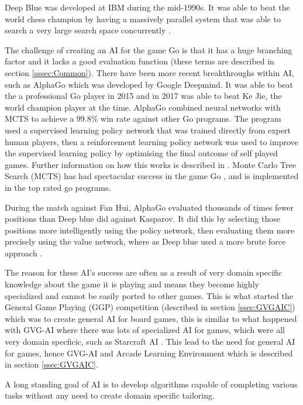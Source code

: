\documentclass[journal]{IEEEtran}
\begin{document}
		Deep Blue was developed at IBM during the mid-1990s. It was able to beat the world chess champion by having a massively parallel system that was able to search a very large search space concurrently \cite{DeepBlue}.

		The challenge of creating an AI for the game Go is that it has a huge branching factor and it lacks a good evaluation function (these terms are described in section \ref{sssec:Common}). 
		There have been more recent breakthroughs within AI, such as AlphaGo \cite{silver2016mastering} which was developed by Google Deepmind. It was able to beat the a professional Go player in 2015 and in 2017 was able to beat Ke Jie, the world champion player at the time\cite{silver2016mastering}.
		AlphaGo combined neural networks with MCTS to achieve a 99.8\% win rate against other Go programs. The program used a supervised learning policy network that was trained directly from expert human players, then a reinforcement learning policy network was used to improve the supervised learning policy by optimising the final outcome of self played games. Further information on how this works is described in \cite{silver2016mastering}.
		Monte Carlo Tree Search (MCTS) has had spectacular success in the game Go \cite{browne2012survey}, and is implemented in the top rated go programs.

		During the match against Fan Hui, AlphaGo evaluated thousands of times fewer positions than Deep blue did against Kasparov. It did this by selecting those positions more intelligently using the policy network, then evaluating them more precisely using the value network, where as Deep blue used a more brute force approach \cite{silver2016mastering, DeepBlue}.

		The reason for these AI's success are often as a result of very domain specific knowledge about the game it is playing and means they become highly specialized and cannot be easily ported to other games. 
		This is what started the General Game Playing (GGP) competition (described in section \ref{ssec:GVGAIC}) which was to create general AI for board games, this is similar to what happened with GVG-AI where there was lots of specialized AI for games, which were all very domain specficic, such as Starcraft AI \cite{ontanon2013survey, hingston2010new}.
		This lead to the need for general AI for games, hence GVG-AI and Arcade Learning Environment which is described in section \ref{ssec:GVGAIC}.
		
		A long standing goal of AI is to develop algorithms capable of completing various tasks without any need to create domain specific tailoring.
		
\end{document}
